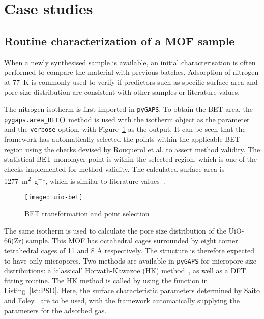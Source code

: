 
\section{Case studies}

\subsection{Routine characterization of a MOF sample}


When a newly synthesised sample is available, an initial characterisation is often performed
to compare the material with previous batches. Adsorption of nitrogen at \SI{77}{\kelvin}
is commonly used to verify if predictors such as specific surface area and pore size 
distribution are consistent with other samples or literature values. 

The nitrogen isotherm is first imported in \texttt{pyGAPS}. To obtain the BET 
area, the \lstinline{pygaps.area_BET()} method is used with the isotherm object as the 
parameter and the \lstinline{verbose} option, with Figure~\ref{fig:uiobet} as the output.
It can be seen that the framework has automatically selected the points within the 
applicable BET region using the checks devised by Rouquerol et al.
\cite{rouquerolAdsorptionPowdersPorous2013} to assert method validity. 
The statistical BET monolayer point is within
the selected region, which is one of the checks implemented for method validity.
The calculated surface area is \SI{1277}{\metre^2\per\gram}, which is similar to
literature values~\cite{wiersumEvaluationUiO66GasBased2011, 
valenzanoDisclosingComplexStructure2011}.

\begin{figure}[ht]
    \texttt{[image: uio-bet]}
    \caption{BET transformation and point selection}%
    \label{fig:uiobet}
\end{figure}

The same isotherm is used to calculate the pore size distribution of the UiO-66(Zr) sample.
This MOF has octahedral cages surrounded by eight corner 
tetrahedral cages of 11 and 8 \si{\angstrom} respectively. 
The structure is therefore expected to have only 
micropores. Two methods are available in \texttt{pyGAPS} for micropore size distributions:
a `classical' Horvath-Kawazoe (HK) method~\cite{horvathMethodCalculationEffective1983}, 
as well as a DFT fitting routine.
The HK method is called by using the function in Listing~\ref{lst:PSD}.
Here, the surface characteristic parameters determined by Saito and 
Foley~\cite{saitoCurvatureParametricSensitivity1991} are to
be used, with the framework automatically supplying the parameters for the adsorbed gas. 

